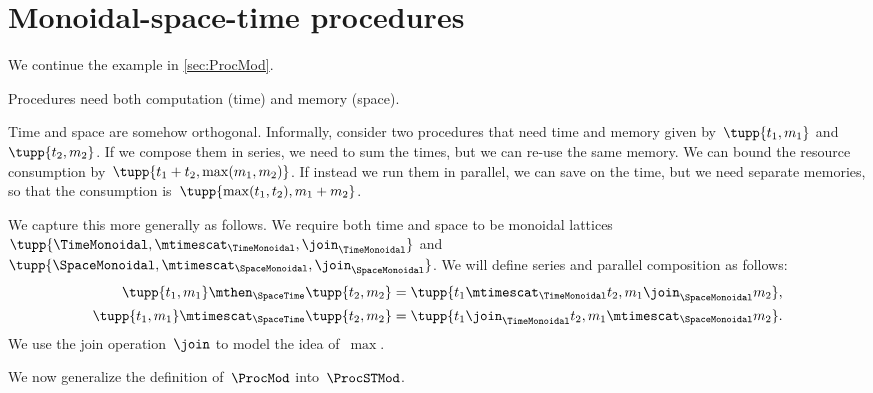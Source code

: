 \section{Monoidal-space-time procedures}
\label{subsec:monoidal-space-time}
We continue the example in \cref{sec:ProcMod}.

Procedures need both computation (time) and memory (space).

Time and space are somehow orthogonal.
%
Informally, consider two procedures that need time and memory given by~$\tupp{t_1,m_1}$ and~$\tupp{t_2, m_2}$.
If we compose them in series, we need to sum the times, but we can re-use the same memory.
We can bound the resource consumption by~$\tupp{t_1+t_2,\max(m_1, m_2)}$.
If instead we run them in parallel, we can save on the time, but we need separate memories, so that the consumption is~$\tupp{\max(t_1,t_2), m_1 + m_2}$.

We capture this more generally as follows.
We require both time and space to be monoidal lattices~$\tupp{\TimeMonoidal, \mtimescat_{\TimeMonoidal}, \join_{\TimeMonoidal}}$ and~$\tupp{\SpaceMonoidal, \mtimescat_{\SpaceMonoidal}, \join_{\SpaceMonoidal}}$.
%
We will define series and parallel composition as follows:
\begin{equation}
    \begin{aligned}
        \tupp{t_1,m_1} \mthen_{\SpaceTime}  \tupp{t_2,m_2}     & = \tupp{t_1 \mtimescat_{\TimeMonoidal} t_2, m_1 \join_{\SpaceMonoidal} m_2}, \\
        \tupp{t_1,m_1} \mtimescat_{\SpaceTime}  \tupp{t_2,m_2} & = \tupp{t_1 \join_{\TimeMonoidal} t_2, m_1 \mtimescat_{\SpaceMonoidal} m_2}.
    \end{aligned}
\end{equation}
We use the join operation~$\join$ to model the idea of~$\max$.

We now generalize the definition of~$\ProcMod$ into~$\ProcSTMod$.

